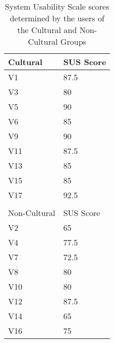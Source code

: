     \begin{table}[ht]
    \begin{tabular}{ll}
    \hline
    \multicolumn{1}{|l|}{Cultural}     & \multicolumn{1}{l|}{SUS Score} \\ \hline
    \multicolumn{1}{|l|}{V1}           & \multicolumn{1}{l|}{87.5}      \\ \hline
    \multicolumn{1}{|l|}{V3}           & \multicolumn{1}{l|}{80}        \\ \hline
    \multicolumn{1}{|l|}{V5}           & \multicolumn{1}{l|}{90}        \\ \hline
    \multicolumn{1}{|l|}{V6}           & \multicolumn{1}{l|}{85}        \\ \hline
    \multicolumn{1}{|l|}{V9}           & \multicolumn{1}{l|}{90}        \\ \hline
    \multicolumn{1}{|l|}{V11}          & \multicolumn{1}{l|}{87.5}      \\ \hline
    \multicolumn{1}{|l|}{V13}          & \multicolumn{1}{l|}{85}        \\ \hline
    \multicolumn{1}{|l|}{V15}          & \multicolumn{1}{l|}{85}        \\ \hline
    \multicolumn{1}{|l|}{V17}          & \multicolumn{1}{l|}{92.5}      \\ \hline
                                       &                                \\ \hline
    \multicolumn{1}{|l|}{Non-Cultural} & \multicolumn{1}{l|}{SUS Score} \\ \hline
    \multicolumn{1}{|l|}{V2}           & \multicolumn{1}{l|}{65}        \\ \hline
    \multicolumn{1}{|l|}{V4}           & \multicolumn{1}{l|}{77.5}      \\ \hline
    \multicolumn{1}{|l|}{V7}           & \multicolumn{1}{l|}{72.5}      \\ \hline
    \multicolumn{1}{|l|}{V8}           & \multicolumn{1}{l|}{80}        \\ \hline
    \multicolumn{1}{|l|}{V10}          & \multicolumn{1}{l|}{80}        \\ \hline
    \multicolumn{1}{|l|}{V12}          & \multicolumn{1}{l|}{87.5}      \\ \hline
    \multicolumn{1}{|l|}{V14}          & \multicolumn{1}{l|}{65}        \\ \hline
    \multicolumn{1}{|l|}{V16}          & \multicolumn{1}{l|}{75}        \\ \hline
    \end{tabular}
        \caption{\label{tab:Table_SUS}System Usability Scale scores determined by the users of the Cultural and Non-Cultural Groups}
    \end{table}
    

